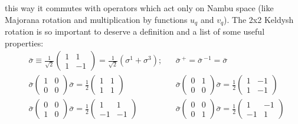\documentclass[a4paper,11pt, english]{article}
\theoremstyle{remark}
\begin{document}
\begin{itemize}
    this way it commutes with operators which act only on Nambu space (like Majorana rotation and multiplication by functions $u_q$ and $v_q$). The 2x2 Keldysh rotation is so important to deserve a definition and a list of some useful properties:
    \begin{align*}
     &\bar{\sigma} \equiv \frac{1}{\sqrt{2}} \begin{pmatrix} 1 &1\\1&-1  \end{pmatrix}=\frac{1}{\sqrt{2}}\left(\sigma^1+\sigma^3\right);& &\bar{\sigma}\,^+=\bar{\sigma}\,^{-1}=\bar{\sigma} \\
     &\bar{\sigma}\begin{pmatrix}1&0\\0&0 \end{pmatrix}\bar{\sigma} = \frac{1}{2}\begin{pmatrix}1&1\\1&1 \end{pmatrix}& &\bar{\sigma}\begin{pmatrix}0&1\\0&0 \end{pmatrix}\bar{\sigma} = \frac{1}{2}\begin{pmatrix}1&-1\\1&-1 \end{pmatrix}\\
     &\bar{\sigma}\begin{pmatrix}0&0\\1&0 \end{pmatrix}\bar{\sigma} = \frac{1}{2}\begin{pmatrix}1&1\\-1&-1 \end{pmatrix}& &\bar{\sigma}\begin{pmatrix}0&0\\0&1 \end{pmatrix}\bar{\sigma} = \frac{1}{2}\begin{pmatrix}1&-1\\-1&1 \end{pmatrix}\\
    \end{align*}  
  \end{itemize}
  
\end{document}
